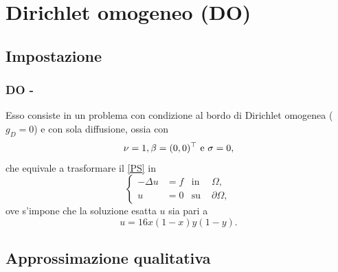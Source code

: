 \documentclass[11pt]{beamer}
\newcommand{\SpaziaturaMate}[3]{
    \setlength{\thinmuskip}{#1mu}
    \setlength{\medmuskip}{#2mu}
    \setlength{\thickmuskip}{#3mu}
}
\newcommand{\teqref}[2]{\hyperref[#1]{#2}}
\begin{document}
        \section{Dirichlet omogeneo (DO)}
        \renewcommand{\titoloSez}{DO}
        
            \subsection{Impostazione}
            
                \begin{frame}\frametitle{\titoloSez{} - \insertsubsection{}}
                    Esso consiste in un problema con condizione al bordo di Dirichlet omogenea ($g_D=0$) e con sola diffusione, ossia con
                    \begin{equation*}
                        \setlength{\abovedisplayskip}{5pt plus 2pt minus 2pt}  %
                        \setlength{\belowdisplayskip}{5pt plus 2pt minus 2pt}  %
                        \nu=1, \beta=(0,0)^{\top}\text{ e }\sigma=0,
                    \end{equation*}
                    che equivale a trasformare il \teqref{eqProblemaStazionario}{[PS]} in
                    \begin{equation*}
                        \left\{
                        \begin{aligned}
                            -\Delta u&=f&\text{in }&\Omega, \\
                                    u&=0&\text{su }&\partial\Omega,
                        \end{aligned}
                        \right.
                        \label{eqDO}
                    \end{equation*}
                    ove s'impone che la soluzione esatta $u$ sia pari a
                    \begin{equation*}
                        u=16x(1-x)y(1-y).
                        \label{eqSoluzioneEsattaDO}
                    \end{equation*}
                \end{frame}

            \subsection{Approssimazione qualitativa}
            
\end{document}
